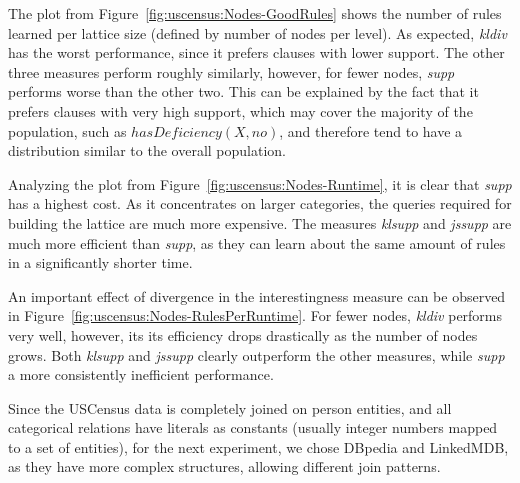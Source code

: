 The plot from Figure~\ref{fig:uscensus:Nodes-GoodRules} shows the number of rules learned per lattice size (defined by
number of nodes per level). As expected, \emph{kldiv} has the worst performance, since it prefers clauses with lower
support. The other three measures perform roughly similarly, however, for
fewer nodes, \emph{supp} performs worse than the other two. This can be explained by the fact that it prefers
clauses with very high support, which may cover the majority of the population, such as $hasDeficiency(X,no)$, and
therefore tend to have a distribution similar to the overall population. 

Analyzing the plot from Figure~\ref{fig:uscensus:Nodes-Runtime}, it is clear that \emph{supp} has a highest cost. As it
concentrates on larger categories, the queries required for building the lattice are much
more expensive. The measures \emph{klsupp} and \emph{jssupp} are much more efficient than \emph{supp},
as they can learn about the same amount of rules in a significantly shorter time.

An important effect of divergence in the interestingness measure can be observed
in Figure~\ref{fig:uscensus:Nodes-RulesPerRuntime}. For fewer nodes, \emph{kldiv} performs very well, however, its
its efficiency drops drastically as the number of nodes grows. Both \emph{klsupp} and \emph{jssupp} clearly outperform
the other measures, while \emph{supp} a more consistently inefficient performance.

Since the USCensus data is completely joined on person entities, and all categorical relations have literals
as constants (usually integer numbers mapped to a set of entities), for the next experiment, we chose DBpedia and
LinkedMDB, as they have more complex structures, allowing different join patterns.

